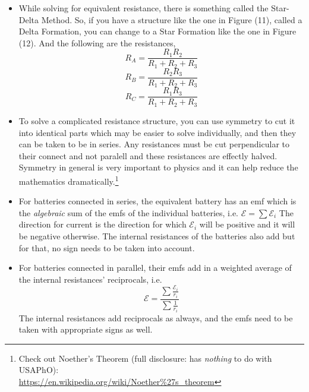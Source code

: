 \documentclass{scrartcl}
\begin{document}
    \begin{itemize}
        \item While solving for equivalent resistance, there is something called the Star-Delta Method. So, if you have a structure like the one in Figure (11), called a Delta Formation, you can change to a Star Formation like the one in Figure (12). And the following are the resistances, \[R_A=\frac{R_1R_2}{R_1+R_2+R_3}\]\[R_B=\frac{R_2R_3}{R_1+R_2+R_3}\]\[R_C=\frac{R_1R_3}{R_1+R_2+R_3}\]
        \item To solve a complicated resistance structure, you can use symmetry to cut it into identical parts which may be easier to solve individually, and then they can be taken to be in series. Any resistances must be cut perpendicular to their connect and not paralell and these resistances are effectly halved. Symmetry in general is very important to physics and it can help reduce the mathematics dramatically.\footnote[1]{Check out Noether's Theorem (full disclosure: has \textit{nothing} to do with USAPhO):\\\url{https://en.wikipedia.org/wiki/Noether\%27s_theorem}}
        \item For batteries connected in series, the equivalent battery has an emf which is the \textit{algebraic} sum of the emfs of the individual batteries, i.e. $\boxed{\mathcal E=\sum\mathcal E_i}$ The direction for current is the direction for which $\mathcal E_i$ will be positive and it will be negative otherwise. The internal resistances of the batteries also add but for that, no sign needs to be taken into account.
        \item For batteries connected in parallel, their emfs add in a weighted average of the internal resistances' reciprocals, i.e.\[\boxed{\mathcal E=\frac{\sum\frac{\mathcal E_i}{r_i}}{\sum\frac1{r_i}}}\] The internal resistances add reciprocals as always, and the emfs need to be taken with appropriate signs as well.
    \end{itemize}
\end{document}
